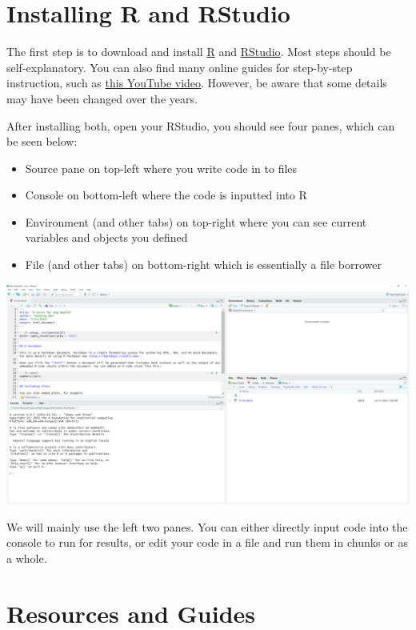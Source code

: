 \documentclass[
]{book}
\providecommand{\tightlist}{%
  \setlength{\itemsep}{0pt}\setlength{\parskip}{0pt}}
\theoremstyle{definition}
\theoremstyle{definition}
\theoremstyle{definition}
\theoremstyle{definition}
\theoremstyle{remark}
\begin{document}
\hypertarget{installing-r-and-rstudio}{%
\section{Installing R and RStudio}\label{installing-r-and-rstudio}}

The first step is to download and install \href{https://www.r-project.org/}{R} and \href{https://www.rstudio.com/products/rstudio/download/\#download}{RStudio}. Most steps should be self-explanatory. You can also find many online guides for step-by-step instruction, such as \href{https://www.youtube.com/watch?v=cX532N_XLIs\&t=19s/}{this YouTube video}. However, be aware that some details may have been changed over the years.

After installing both, open your RStudio, you should see four panes, which can be seen below:

\begin{itemize}
\tightlist
\item
  Source pane on top-left where you write code in to files
\item
  Console on bottom-left where the code is inputted into R
\item
  Environment (and other tabs) on top-right where you can see current variables and objects you defined
\item
  File (and other tabs) on bottom-right which is essentially a file borrower
\end{itemize}

\includegraphics[width=1\textwidth,height=\textheight]{images/RStudio.png}

We will mainly use the left two panes. You can either directly input code into the console to run for results, or edit your code in a file and run them in chunks or as a whole.

\hypertarget{r-basic}{%
\section{Resources and Guides}\label{r-basic}}
\end{document}
